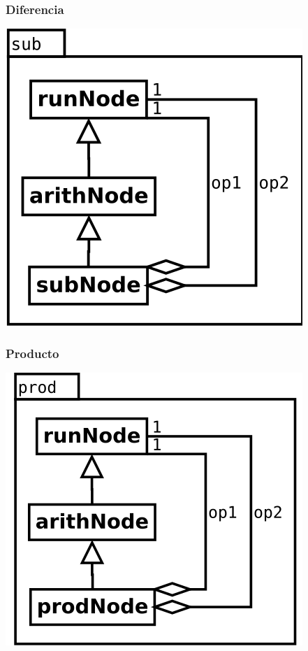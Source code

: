 \subsubsection {Diferencia}
\begin{center}
\includegraphics[scale=0.4]{sub.png} \\
\end{center}

\subsubsection {Producto}
\begin{center}
\includegraphics[scale=0.4]{prod.png} \\
\end{center}

